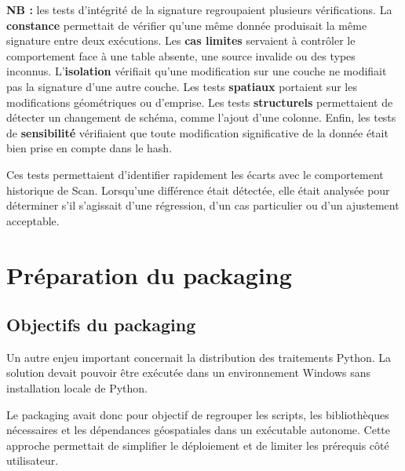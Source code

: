 \textbf{NB :} les tests d'intégrité de la signature regroupaient plusieurs
vérifications. La \textbf{constance} permettait de vérifier qu'une même donnée
produisait la même signature entre deux exécutions. Les \textbf{cas limites}
servaient à contrôler le comportement face à une table absente, une source
invalide ou des types inconnus. L'\textbf{isolation} vérifiait qu'une
modification sur une couche ne modifiait pas la signature d'une autre couche.
Les tests \textbf{spatiaux} portaient sur les modifications géométriques ou
d'emprise. Les tests \textbf{structurels} permettaient de détecter un changement
de schéma, comme l'ajout d'une colonne. Enfin, les tests de
\textbf{sensibilité} vérifiaient que toute modification significative de la
donnée était bien prise en compte dans le hash.

Ces tests permettaient d'identifier rapidement les écarts avec le comportement
historique de Scan. Lorsqu'une différence était détectée, elle était analysée
pour déterminer s'il s'agissait d'une régression, d'un cas particulier ou d'un
ajustement acceptable.


\section{Préparation du packaging}
\label{sec:preparation_packaging}


\subsection{Objectifs du packaging}
\label{subsec:objectifs_packaging}

Un autre enjeu important concernait la distribution des traitements Python. La
solution devait pouvoir être exécutée dans un environnement Windows sans
installation locale de Python.

Le packaging avait donc pour objectif de regrouper les scripts, les
bibliothèques nécessaires et les dépendances géospatiales dans un exécutable
autonome. Cette approche permettait de simplifier le déploiement et de limiter
les prérequis côté utilisateur.

